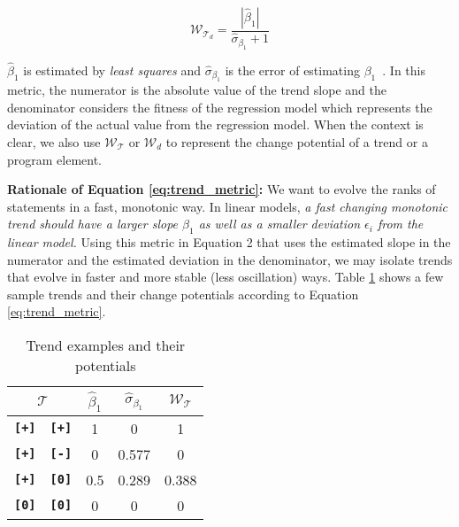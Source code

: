 \begin{equation}
\label{eq:trend_metric}
	\mathcal{W}_{\mathcal{T}_d} =  \frac{| \hat{\beta}_{1} |}{\hat{\sigma}_{\beta_{1}}+1}
\end{equation}


\noindent
$\hat{\beta}_{1}$ is estimated by {\em least squares} and $\hat{\sigma}_{\beta_{1}}$ is the error of estimating $\beta_{1}$~\citep{GrIy94}. In this metric, the numerator is the absolute value of the trend slope and the denominator considers the fitness of the regression model which represents the deviation of the actual value from the regression model.
When the context is clear, we also use $\mathcal{W}_\mathcal{T}$ or $\mathcal{W}_d$ to represent the change potential of a trend or a program element.

\noindent\textbf{Rationale of Equation \ref{eq:trend_metric}:} We want to evolve the ranks of statements in a fast, monotonic way. In linear models, \textit{a fast changing monotonic trend should have a larger slope $\beta_1$ as well as a smaller deviation $\epsilon_i$ from the linear model.}
Using this metric in Equation 2 that uses the estimated slope in the numerator and the estimated deviation in the denominator, we may isolate trends that evolve in faster and more stable (less oscillation) ways. Table \ref{tab:trend_exp} shows a few sample trends and their change potentials according to Equation \ref{eq:trend_metric}.

\begin{table}[!htbp]
	\centering
	\caption{Trend examples and their potentials}
		\renewcommand{\arraystretch}{1.5}
        \begin{tabular}{|cc|ccc|}
			\hline
			 \multicolumn{ 2}{|c|}{$\mathcal{T}$} &     $\hat{\beta}_{1}$ &      $\hat{\sigma}_{\beta_{1}}$ &  $\mathcal{W}_\mathcal{T}$ \\
			\hline\hline
			 {\bf \texttt{[+]}} &  {\bf \texttt{[+]}} &          1 &          0 &          1 \\
			\hline
			 {\bf \texttt{[+]}} &  {\bf \texttt{[-]}} &          0 &      0.577 &          0 \\
			\hline
			 {\bf \texttt{[+]}} &  {\bf \texttt{[0]}} &        0.5 &      0.289 &      0.388 \\
			\hline
			 {\bf \texttt{[0]}} &  {\bf \texttt{[0]}} &          0 &          0 &          0 \\
			\hline
		\end{tabular}
	\label{tab:trend_exp}
\end{table}

